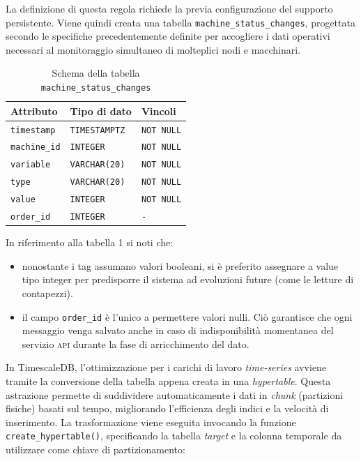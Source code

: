 \documentclass[12pt]{article}
\begin{document}
    La definizione di questa regola richiede la previa configurazione del supporto persistente. Viene quindi creata una tabella \verb|machine_status_changes|, progettata secondo le specifiche precedentemente definite per accogliere i dati operativi necessari al monitoraggio simultaneo di molteplici nodi e macchinari.
    
    \begin{table}[htbp]
        \centering
        \caption{Schema della tabella \texttt{machine\_status\_changes}}
        \label{tab:schema_database}
        \begin{tabular}{lll}
            \hline
            \textbf{Attributo} & \textbf{Tipo di dato} & \textbf{Vincoli} \\ \hline
            \verb|timestamp|   & \verb|TIMESTAMPTZ|   & \verb|NOT NULL| \\
            \verb|machine_id|  & \verb|INTEGER|       & \verb|NOT NULL| \\
            \verb|variable|    & \verb|VARCHAR(20)|   & \verb|NOT NULL| \\
            \verb|type|        & \verb|VARCHAR(20)|   & \verb|NOT NULL| \\
            \verb|value|       & \verb|INTEGER|       & \verb|NOT NULL| \\
            \verb|order_id|    & \verb|INTEGER|       & \verb|-| \\ \hline
        \end{tabular}
    \end{table}
    
    
    In riferimento alla tabella 1 si noti che:
    \begin{itemize}
        \item nonostante i tag assumano valori booleani, si è preferito assegnare a value tipo integer per predisporre il sistema ad evoluzioni future (come le letture di contapezzi).
        \item il campo \verb|order_id| è l'unico a permettere valori nulli. Ciò garantisce che ogni messaggio venga salvato anche in caso di indisponibilità momentanea del servizio \textsc{api} durante la fase di arricchimento del dato.
    \end{itemize}

    

    In TimescaleDB, l'ottimizzazione per i carichi di lavoro \textit{time-series} avviene tramite la conversione della tabella appena creata in una \textit{hypertable}. Questa astrazione permette di suddividere automaticamente i dati in \textit{chunk} (partizioni fisiche) basati sul tempo, migliorando l'efficienza degli indici e la velocità di inserimento. La trasformazione viene eseguita invocando la funzione \verb|create_hypertable()|, specificando la tabella \textit{target} e la colonna temporale da utilizzare come chiave di partizionamento:
    
\end{document}
